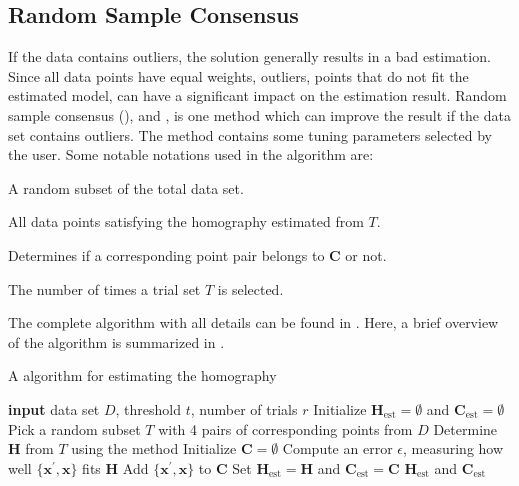 \subsection{Random Sample Consensus}
\label{sec:ransac}
If the data contains outliers, the \abbrDLT solution generally results in a bad estimation.
Since all data points have equal weights, outliers, \ie points that do not fit the estimated model, can have a significant impact on the estimation result.
Random sample consensus (\abbrRANSAC), \eg \cite{Hartley:2004} and \cite{Nordberg:2015}, is one method which can improve the result if the data set contains outliers.
The method contains some tuning parameters selected by the user.
Some notable notations used in the algorithm are:

\begin{description}[align=left,labelwidth=3cm,noitemsep]
	\item [Trial set $T$] A random subset of the total data set.
	\item [Consensus set $\bm{C}$] All data points satisfying the homography estimated from $T$.
	\item [Threshold $t$] Determines if a corresponding point pair belongs to $\bm{C}$ or not.
	\item [Number of trials $r$] The number of times a trial set $T$ is selected.
\end{description}

The complete algorithm with all details can be found in \cite{Nordberg:2015}.
Here, a brief overview of the algorithm is summarized in .

\begin{algorithm}[!ht]
	\caption{\label{algo:ransach} A \abbrRANSAC algorithm for estimating the homography}
	\begin{algorithmic}
		\State \textbf{input} data set $D$, threshold $t$, number of trials $r$
		\State Initialize $\bm{H}_\text{est} = \emptyset$ and $\bm{C}_\text{est} = \emptyset$
			\State Pick a random subset $T$ with 4 pairs of corresponding points from $D$
			\State Determine $\bm{H}$ from $T$ using the \abbrDLT method
			\State Initialize $\bm{C} = \emptyset$
				\State Compute an error $\epsilon$, measuring how well $\{\bm{x}^\prime, \bm{x}\}$ fits $\bm{H}$
					\State Add $\{\bm{x}^\prime, \bm{x}\}$ to $\bm{C}$
				\EndIf
			\EndFor
				\State Set $\bm{H}_\text{est} = \bm{H}$ and $\bm{C}_\text{est} = \bm{C}$
			\EndIf
		\EndWhile
		\State \Return $\bm{H}_\text{est}$ and $\bm{C}_\text{est}$
	\end{algorithmic}
\end{algorithm}

